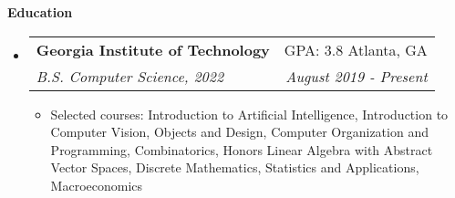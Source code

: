 \documentclass[letterpaper,10pt]{article}
\makeatletter
\newcommand{\resitem}[1]{\item #1 \vspace{-3.5pt}}
\newcommand{\resheading}[1]{{\large \colorbox{mygrey}{\begin{minipage}{\textwidth}{\textbf{#1 \vphantom{p\^{E}}}}\end{minipage}}}}
\newcommand{\ressubheading}[4]{
\begin{tabular*}{7.0in}{l@{\extracolsep{\fill}}r}
		\textbf{#1} & #2 \\
		\textit{#3} & \textit{#4} \\
\end{tabular*}\vspace{-6pt}}
\makeatother
\begin{document}
\resheading{Education}
\begin{itemize}
\item[]  %
    \ressubheading{Georgia Institute of Technology}{GPA: 3.8 \hspace{1em} Atlanta, GA}{B.S. Computer Science, 2022}{August 2019 - Present}
	\begin{itemize}
	    \resitem{Selected courses: Introduction to Artificial Intelligence, Introduction to Computer Vision, Objects and Design, Computer Organization and Programming, Combinatorics, Honors Linear Algebra with Abstract Vector Spaces, Discrete Mathematics, Statistics and Applications, Macroeconomics}
	\end{itemize}
\end{itemize}
\end{document}
